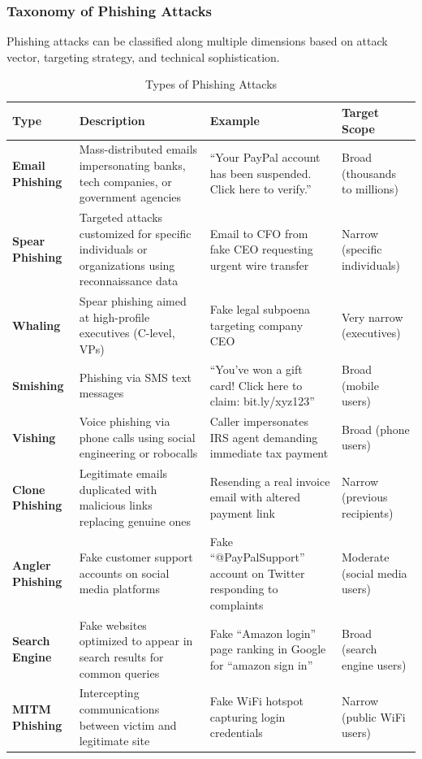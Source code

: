 \subsubsection{Taxonomy of Phishing
Attacks}\label{taxonomy-of-phishing-attacks}

Phishing attacks can be classified along multiple dimensions based on
attack vector, targeting strategy, and technical sophistication.

\setlength{\tabcolsep}{4pt}
\small
\begin{longtable}{
>{\raggedright\arraybackslash}p{}
>{\raggedright\arraybackslash}p{}
>{\raggedright\arraybackslash}p{}
>{\raggedright\arraybackslash}p{}}
\caption{Types of Phishing Attacks} \\
\toprule
Type & Description & Example & Target Scope \\
\midrule

\textbf{Email Phishing} & Mass-distributed emails impersonating banks,
tech companies, or government agencies & ``Your PayPal account has been
suspended. Click here to verify.'' & Broad (thousands to millions) \\
\textbf{Spear Phishing} & Targeted attacks customized for specific
individuals or organizations using reconnaissance data & Email to CFO
from fake CEO requesting urgent wire transfer & Narrow (specific
individuals) \\
\textbf{Whaling} & Spear phishing aimed at high-profile executives
(C-level, VPs) & Fake legal subpoena targeting company CEO & Very narrow
(executives) \\
\textbf{Smishing} & Phishing via SMS text messages & ``You've won a gift
card! Click here to claim: bit.ly/xyz123'' & Broad (mobile users) \\
\textbf{Vishing} & Voice phishing via phone calls using social
engineering or robocalls & Caller impersonates IRS agent demanding
immediate tax payment & Broad (phone users) \\
\textbf{Clone Phishing} & Legitimate emails duplicated with malicious
links replacing genuine ones & Resending a real invoice email with
altered payment link & Narrow (previous recipients) \\
\textbf{Angler Phishing} & Fake customer support accounts on social
media platforms & Fake ``@PayPalSupport'' account on Twitter responding
to complaints & Moderate (social media users) \\
\textbf{Search Engine} & Fake websites optimized to appear in
search results for common queries & Fake ``Amazon login'' page ranking
in Google for ``amazon sign in'' & Broad (search engine users) \\
\textbf{MITM Phishing} & Intercepting communications
between victim and legitimate site & Fake WiFi hotspot capturing login
credentials & Narrow (public WiFi users) \\

\bottomrule
\end{longtable}
\normalsize
\setlength{\tabcolsep}{6pt}

